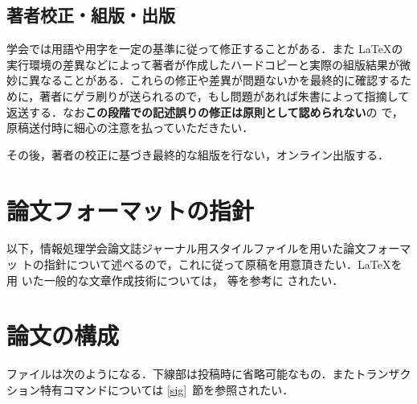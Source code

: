 \documentclass[submit,techrep]{ipsj}
\begin{document}
\subsection{著者校正・組版・出版}

学会では用語や用字を一定の基準に従って修正することがある．また \LaTeX の
実行環境の差異などによって著者が作成したハードコピーと実際の組版結果が微
妙に異なることがある．これらの修正や差異が問題ないかを最終的に確認するた
めに，著者にゲラ刷りが送られるので，もし問題があれば朱書によって指摘して
返送する．なお{\bf この段階での記述誤りの修正は原則として認められない}の
で，原稿送付時に細心の注意を払っていただきたい．

その後，著者の校正に基づき最終的な組版を行ない，オンライン出版する．



\section{論文フォーマットの指針}
\label{sec:format}

以下，情報処理学会論文誌ジャーナル用スタイルファイルを用いた論文フォーマッ
トの指針について述べるので，これに従って原稿を用意頂きたい．\LaTeX を用
いた一般的な文章作成技術については，\cite{okumura, companion} 等を参考に
されたい．

\section{論文の構成}
\label{config}

ファイルは次のようになる．下線部は投稿時に省略可能なもの．またトランザク
ション特有コマンドについては \ref{sig}~節を参照されたい．
\end{document}
